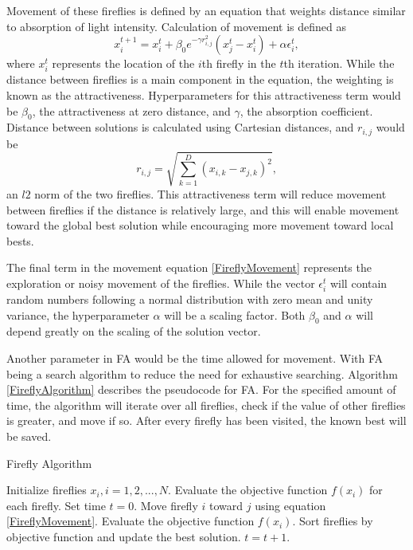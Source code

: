 \documentclass[conference]{IEEEtran}
\begin{document}
    Movement of these fireflies is defined by an equation that weights distance similar to absorption of light intensity. Calculation of movement is defined as 
    \begin{equation}
    \label{FireflyMovement}
        x^{t+1}_i = x^t_i + \beta_0 e^{-\gamma r^2_{i,j}} (x^t_j - x^t_i) + \alpha \epsilon^t_i,
    \end{equation}
    where $x^t_i$ represents the location of the $i$th firefly in the $t$th iteration. While the distance between fireflies is a main component in the equation, the weighting is known as the attractiveness. Hyperparameters for this attractiveness term would be $\beta_0$, the attractiveness at zero distance, and $\gamma$, the absorption coefficient. Distance between solutions is calculated using Cartesian distances, and $r_{i,j}$ would be 
    \begin{equation}
    \label{CartesianDistance}
        r_{i,j} = \sqrt{\sum_{k=1}^{D} (x_{i,k} - x_{j,k})^2},
    \end{equation}
    an $l2$ norm of the two fireflies. This attractiveness term will reduce movement between fireflies if the distance is relatively large, and this will enable movement toward the global best solution while encouraging more movement toward local bests.

    The final term in the movement equation \ref{FireflyMovement} represents the exploration or noisy movement of the fireflies. While the vector $\epsilon^t_i$ will contain random numbers following a normal distribution with zero mean and unity variance, the hyperparameter $\alpha$ will be a scaling factor. Both $\beta_0$ and $\alpha$ will depend greatly on the scaling of the solution vector.

    Another parameter in FA would be the time allowed for movement. With FA being a search algorithm to reduce the need for exhaustive searching. Algorithm \ref{FireflyAlgorithm} describes the pseudocode for FA. For the specified amount of time, the algorithm will iterate over all fireflies, check if the value of other fireflies is greater, and move if so. After every firefly has been visited, the known best will be saved.

    \begin{algorithm}
    \caption{Firefly Algorithm}
    \label{FireflyAlgorithm}
    \begin{algorithmic}
    \STATE Initialize fireflies $x_i, i = 1, 2, ..., N$.
    \STATE Evaluate the objective function $f(x_i)$ for each firefly.
    \STATE Set time $t = 0$.
                    \STATE Move firefly $i$ toward $j$ using equation \ref{FireflyMovement}.
                    \STATE Evaluate the objective function $f(x_i)$.
                \ENDIF
            \ENDFOR
        \ENDFOR
        \STATE Sort fireflies by objective function and update the best solution.
        \STATE $t = t + 1$.
    \ENDWHILE
    \end{algorithmic}
    \end{algorithm}
\end{document}
